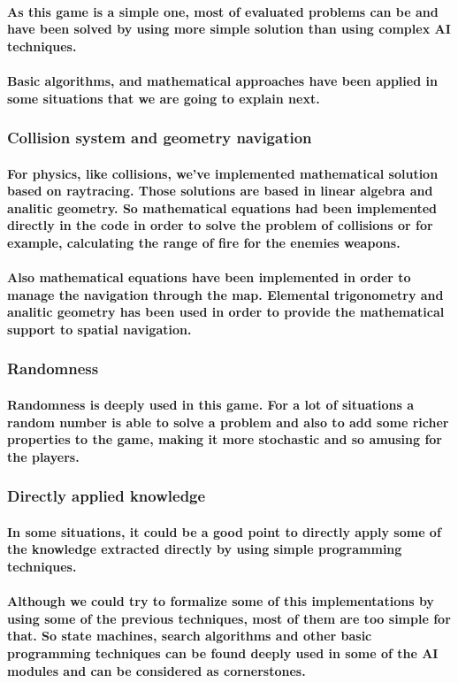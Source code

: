 \documentclass[a4paper,10pt]{article}
\newcommand{\p}[1]{\paragraph{\indent\textnormal{#1}}}
\begin{document}
    \p{As this game is a simple one, most of evaluated problems can be and have been solved by using more simple solution than using complex AI techniques.}

    \p{Basic algorithms, and mathematical approaches have been applied in some situations that we are going to explain next.}

    \subsubsection{Collision system and geometry navigation}

      \p{For physics, like collisions, we've implemented mathematical solution based on raytracing. Those solutions are based in linear algebra and analitic geometry. So mathematical equations had been implemented directly in the code in order to solve the problem of collisions or for example, calculating the range of fire for the enemies weapons.}

      \p{Also mathematical equations have been implemented in order to manage the navigation through the map. Elemental trigonometry and analitic geometry has been used in order to provide the mathematical support to spatial navigation.}

    \subsubsection{Randomness}

      \p{Randomness is deeply used in this game. For a lot of situations a random number is able to solve a problem and also to add some richer properties to the game, making it more stochastic and so amusing for the players.}

    \subsubsection{Directly applied knowledge}

      \p{In some situations, it could be a good point to directly apply some of the knowledge extracted directly by using simple programming techniques.}

      \p{Although we could try to formalize some of this implementations by using some of the previous techniques, most of them are too simple for that. So state machines, search algorithms and other basic programming techniques can be found deeply used in some of the AI modules and can be considered as cornerstones.}
\end{document}
